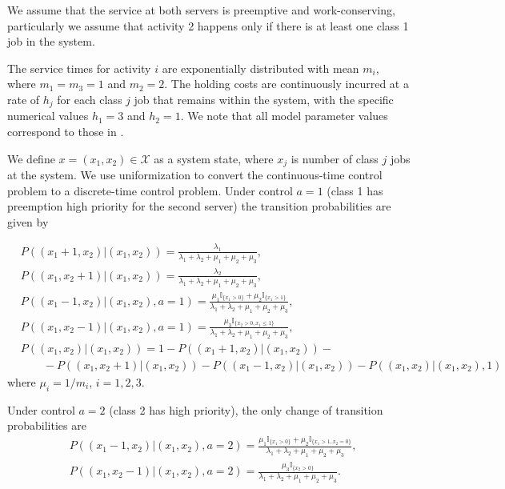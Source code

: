 \documentclass[11pt]{article}
\newcommand{\I}{\mathbb{I}}
\newcommand{\X}{\mathcal{X}}
\theoremstyle{definition}
\numberwithin{equation}{section}
\begin{document}
We assume that  the  service at both servers is preemptive and work-conserving, particularly we assume that activity 2 happens only if there is at least one class 1 job in the system.

The service times for activity $i$ are exponentially distributed with mean $m_i$, where $m_1=m_3=1$ and $m_2=2$.
 The holding costs are continuously incurred at a rate of $h_j$ for each class $j$ job that remains within the system, with the specific
numerical values $h_1 = 3$ and $h_2 = 1.$ We note that all model parameter values   correspond to those in \cite{Harrison1998}.

We define $x = (x_1, x_2)\in \X$ as a system state, where $x_j$ is number of class $j$ jobs at the system. We use uniformization to convert the continuous-time control problem to a discrete-time control problem.
Under control $a = 1$ (class 1 has preemption high priority for the second server) the transition probabilities are given by

\begin{align*}
&P\left((x_1+1, x_2)|(x_1, x_2)\right)= \frac{\lambda_1}{\lambda_1+\lambda_2+\mu_1+\mu_2+\mu_3},\\
&P\left((x_1, x_2+1)|(x_1, x_2)\right) = \frac{\lambda_2}{\lambda_1+\lambda_2+\mu_1+\mu_2+\mu_3},\\
&P\left((x_1-1, x_2)|(x_1, x_2),a= 1\right) = \frac{\mu_1\I_{\{x_1>0\}} + \mu_2\I_{\{x_1>1\}}}{\lambda_1+\lambda_2+\mu_1+\mu_2+\mu_3},\\
&P\left((x_1, x_2-1)|(x_1, x_2), a=1\right) = \frac{\mu_3\I_{\{x_2>0, x_1\leq 1\}}}{\lambda_1+\lambda_2+\mu_1+\mu_2+\mu_3},\\
&P\left((x_1, x_2 )|(x_1, x_2) \right) = 1 - P\left((x_1+1, x_2)|(x_1, x_2)\right)  - \\
 &\quad \quad -P\left((x_1, x_2+1)|(x_1, x_2)\right) -P\left((x_1-1, x_2)|(x_1, x_2) \right) - P\left((x_1, x_2 )|(x_1, x_2), 1\right)
\end{align*}
where $\mu_i  = 1/m_i$, $i=1, 2, 3.$

 Under control $a=2$ (class 2 has high priority), the only change of transition probabilities are
 \begin{align*}
&P\left((x_1-1, x_2)|(x_1, x_2), a=2\right) = \frac{\mu_1\I_{\{x_1>0\}} + \mu_2\I_{\{x_1>1, x_2=0\}}}{\lambda_1+\lambda_2+\mu_1+\mu_2+\mu_3},\\
&P\left((x_1, x_2-1)|(x_1, x_2), a=2\right) = \frac{\mu_3\I_{\{x_2>0\}}}{\lambda_1+\lambda_2+\mu_1+\mu_2+\mu_3}.\\
\end{align*}
\end{document}
